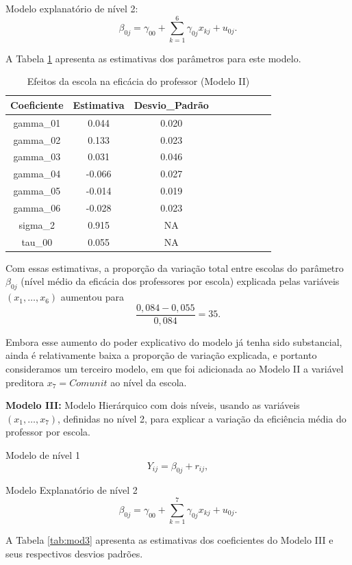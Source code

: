 \documentclass[]{book}
\theoremstyle{definition}
\theoremstyle{definition}
\theoremstyle{definition}
\theoremstyle{remark}
\begin{document}
Modelo explanatório de nível 2: \[
\beta _{0j}=\gamma _{00}+\sum\limits_{k=1}^{6}\gamma _{0j}x_{kj}+u_{0j}.
\]

A Tabela \ref{tab:mod2} apresenta as estimativas dos parâmetros para
este modelo.

\begin{table}

\caption{\label{tab:mod2}Efeitos da escola na eficácia do professor (Modelo II)}
\centering
\begin{tabular}[t]{ccccccccc}
\toprule
Coeficiente & Estimativa & Desvio\_Padrão\\
\midrule
gamma\_01 & 0.044 & 0.020\\
gamma\_02 & 0.133 & 0.023\\
gamma\_03 & 0.031 & 0.046\\
gamma\_04 & -0.066 & 0.027\\
gamma\_05 & -0.014 & 0.019\\
\addlinespace
gamma\_06 & -0.028 & 0.023\\
sigma\_2 & 0.915 & NA\\
tau\_00 & 0.055 & NA\\
\bottomrule
\end{tabular}
\end{table}

Com essas estimativas, a proporção da variação total entre escolas do
parâmetro \(\beta _{0j}\) (nível médio da eficácia dos professores por
escola) explicada pelas variáveis \(\left(x_{1},\ldots ,x_{6}\right)\)
aumentou para \[
\frac{0,084-0,055}{0,084}=35.
\]

Embora esse aumento do poder explicativo do modelo já tenha sido
substancial, ainda é relativamente baixa a proporção de variação
explicada, e portanto consideramos um terceiro modelo, em que foi
adicionada ao Modelo II a variável preditora \(x_{7}=Comunit\) ao nível
da escola.

\textbf{Modelo III:} Modelo Hierárquico com dois níveis, usando as
variáveis \(\left( x_{1},\ldots ,x_{7}\right)\), definidas no nível 2,
para explicar a variação da eficiência média do professor por escola.

Modelo de nível 1 \[
Y_{ij}=\beta _{0j}+r_{ij},
\]

Modelo Explanatório de nível 2 \[
\beta _{0j}=\gamma _{00}+\sum\limits_{k=1}^{7}\gamma _{0j}x_{kj}+u_{0j}.
\]

A Tabela \ref{tab:mod3} apresenta as estimativas dos coeficientes do
Modelo III e seus respectivos desvios padrões.
\end{document}

